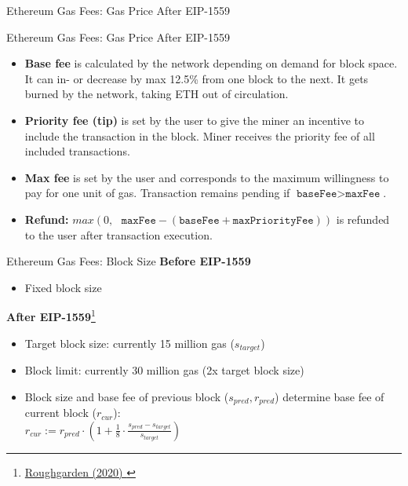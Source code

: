 \documentclass[handout]{beamer}
\begin{document}
\begin{frame}{Ethereum Gas Fees: Gas Price After EIP-1559}
	\begin{center}
		\begin{tikzpicture}
			
		\end{tikzpicture}
	\end{center}	
\end{frame}

\begin{frame}{Ethereum Gas Fees: Gas Price After EIP-1559}
	\begin{itemize}
		\item \textbf{Base fee} is calculated by the network depending on demand for block space. It can in- or decrease by max 12.5\% from one block to the next. It gets burned by the network, taking ETH out of circulation.
		\item \textbf{Priority fee (tip)} is set by the user to give the miner an incentive to include the transaction in the block. Miner receives the priority fee of all included transactions.
		\item \textbf{Max fee} is set by the user and corresponds to the maximum willingness to pay for one unit of gas. Transaction remains pending if $\texttt{baseFee}  > \texttt{maxFee} $.
		\item \textbf{Refund:} $max \left(0, \text{ }\texttt{maxFee} - (\texttt{baseFee}  + \texttt{maxPriorityFee} )\right)$ is refunded to the user after transaction execution. 
	\end{itemize}	
\end{frame}

\begin{frame}{Ethereum Gas Fees: Block Size}
	\textbf{Before EIP-1559}
	\begin{itemize}
		\item Fixed block size
	\end{itemize}
	\vspace{0.2cm}
	\textbf{After EIP-1559}\footnote{\href{https://timroughgarden.org/papers/eip1559.pdf}{Roughgarden (2020) \link}}
	\begin{itemize}
		\item Target block size: currently 15 million gas ($s_{target}$)
		\item Block limit: currently 30 million gas (2x target block size)
		\item Block size and base fee of previous block ($s_{pred}, r_{pred}$) determine base fee of current block ($r_{cur}$):\\
		\vspace{0.1cm}
		$r_{cur} := r_{pred}\cdot\left(1+\frac{1}{8}\cdot\frac{s_{pred}-s_{target}}{s_{target}}\right)$
	\end{itemize}
\end{frame}
\end{document}
